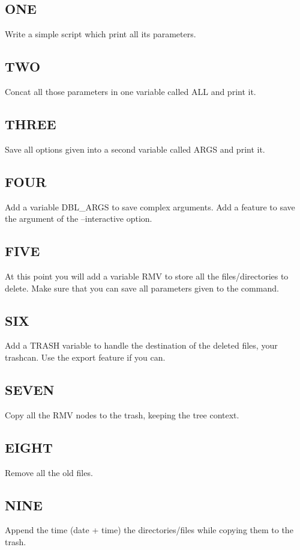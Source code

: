 \subsection{ONE}
Write a simple script which print all its parameters.

\subsection{TWO}
Concat all those parameters in one variable called ALL and print it.

\subsection{THREE}
Save all options given into a second variable called ARGS and print it.

\subsection{FOUR}
Add a variable DBL\_ARGS  to save complex arguments.
Add a feature to save the argument of the --interactive option.

\subsection{FIVE}
At this point you will add a variable RMV to store all the files/directories to delete.
Make sure that you can save all parameters given to the command.

\subsection{SIX}
Add a TRASH variable to handle the destination of the deleted files, your trashcan.
Use the export feature if you can.

\subsection{SEVEN}
Copy all the RMV nodes to the trash, keeping the tree context.

\subsection{EIGHT}
Remove all the old files.

\subsection{NINE}
Append the time (date + time) the directories/files while copying them to the trash.


